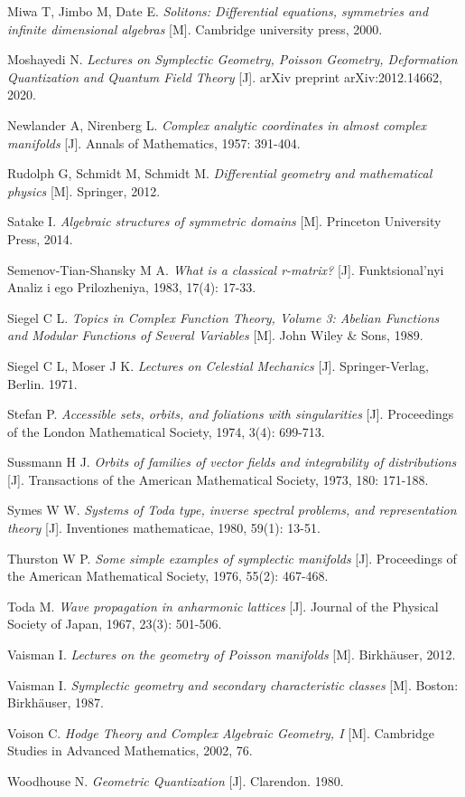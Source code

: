 \documentclass[12pt, b5paper]{article}   %
\begin{document}
\begin{thebibliography}{99}
Miwa T, Jimbo M, Date E.
\textit{Solitons: Differential equations, symmetries and infinite dimensional algebras} [M].
Cambridge university press, 2000.

Moshayedi N. 
\textit{Lectures on Symplectic Geometry, Poisson Geometry, Deformation Quantization and Quantum Field Theory} [J]. 
arXiv preprint arXiv:2012.14662, 2020.

Newlander A, Nirenberg L.
\textit{Complex analytic coordinates in almost complex manifolds} [J]. Annals of Mathematics, 1957: 391-404.

Rudolph G, Schmidt M, Schmidt M.
\textit{Differential geometry and mathematical physics} [M]. Springer, 2012.

Satake I. \textit{Algebraic structures of symmetric domains} [M].
Princeton University Press, 2014.

Semenov-Tian-Shansky M A.
\textit{What is a classical r-matrix?} [J].
Funktsional'nyi Analiz i ego Prilozheniya, 1983, 17(4): 17-33.

Siegel C L.
\textit{Topics in Complex Function Theory, Volume 3:
Abelian Functions and Modular Functions of Several Variables}
[M]. John Wiley \& Sons, 1989.

Siegel C L, Moser J K.
\textit{Lectures on Celestial Mechanics}  [J]. Springer-Verlag, Berlin. 1971.

Stefan P.
\textit{Accessible sets, orbits, and foliations with singularities} [J].
Proceedings of the London Mathematical Society, 1974, 3(4): 699-713.

Sussmann H J.
\textit{Orbits of families of vector fields and integrability of distributions} [J].
Transactions of the American Mathematical Society, 1973, 180: 171-188.

Symes W W.
\textit{Systems of Toda type, inverse spectral problems, and representation theory} [J].
Inventiones mathematicae, 1980, 59(1): 13-51.

Thurston W P.
\textit{Some simple examples of symplectic manifolds} [J].
Proceedings of the American Mathematical Society, 1976, 55(2): 467-468.

Toda M.
\textit{Wave propagation in anharmonic lattices} [J].
Journal of the Physical Society of Japan, 1967, 23(3): 501-506.

Vaisman I.
\textit{Lectures on the geometry of Poisson manifolds} [M]. Birkhäuser, 2012.

Vaisman I.
\textit{Symplectic geometry and secondary characteristic classes} [M].
Boston: Birkhäuser, 1987.

Voison C.
\textit{Hodge Theory and Complex Algebraic Geometry, I} [M].
Cambridge Studies in Advanced Mathematics, 2002, 76.

Woodhouse N. \textit{Geometric Quantization} [J]. Clarendon. 1980.
\end{thebibliography}
\end{document}
